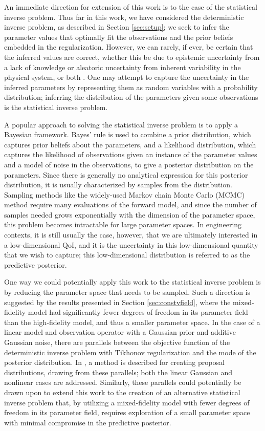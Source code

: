 An immediate direction for extension of this work is to the case of the statistical inverse problem. Thus far in this work, we have considered the deterministic inverse problem, as described in Section \ref{sec:setup}; we seek to infer the parameter values that optimally fit the observations and the prior beliefs embedded in the regularization. However, we can rarely, if ever, be certain that the inferred values are correct, whether this be due to epistemic uncertainty from a lack of knowledge or aleatoric uncertainty from inherent variability in the physical system, or both \cite{Ober04}. One may attempt to capture the uncertainty in the inferred parameters by representing them as random variables with a probability distribution; inferring the distribution of the parameters given some observations is the statistical inverse problem. 

A popular approach to solving the statistical inverse problem is to apply a Bayesian framework. Bayes' rule is used to combine a prior distribution, which captures prior beliefs about the parameters, and a likelihood distribution, which captures the likelihood of observations given an instance of the parameter values and a model of noise in the observations, to give a posterior distribution on the parameters. Since there is generally no analytical expression for this posterior distribution, it is usually characterized by samples from the distribution. Sampling methods like the widely-used Markov chain Monte Carlo (MCMC) method require many evaluations of the forward model, and since the number of samples needed grows exponentially with the dimension of the parameter space, this problem becomes intractable for large parameter spaces. In engineering contexts, it is still usually the case, however, that we are ultimately interested in a low-dimensional QoI, and it is the uncertainty in this low-dimensional quantity that we wish to capture; this low-dimensional distribution is referred to as the predictive posterior.

One way we could potentially apply this work to the statistical inverse problem is by reducing the parameter space that needs to be sampled. Such a direction is suggested by the results presented in Section \ref{sec:constvfield}, where the mixed-fidelity model had significantly fewer degrees of freedom in its parameter field than the high-fidelity model, and thus a smaller parameter space. In the case of a linear model and observation operator with a Gaussian prior and additive Gaussian noise, there are parallels between the objective function of the deterministic inverse problem with Tikhonov regularization and the mode of the posterior distribution. In \cite{Martetal12}, a method is described for creating proposal distributions, drawing from these parallels; both the linear Gaussian and nonlinear cases are addressed. Similarly, these parallels could potentially be drawn upon to extend this work to the creation of an alternative statistical inverse problem that, by utilizing a mixed-fidelity model with fewer degrees of freedom in its parameter field, requires exploration of a small parameter space with minimal compromise in the predictive posterior.

